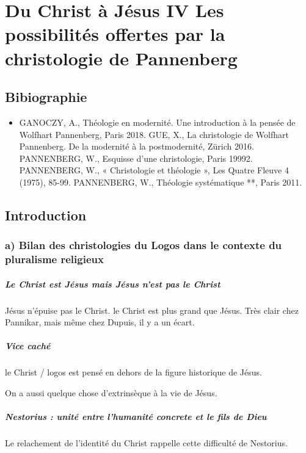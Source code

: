 \chapter{Du Christ à Jésus IV
Les possibilités offertes par la christologie de Pannenberg}
 

 

\section{Bibiographie}
\begin{itemize}
    \item GANOCZY, A., Théologie en modernité. Une introduction à la pensée de Wolfhart
Pannenberg, Paris 2018.
GUE, X., La christologie de Wolfhart Pannenberg. De la modernité à la postmodernité,
Zürich 2016.
PANNENBERG, W., Esquisse d’une christologie, Paris 19992.
PANNENBERG, W., « Christologie et théologie », Les Quatre Fleuve 4 (1975), 85-99.
PANNENBERG, W., Théologie systématique **, Paris 2011.
\end{itemize}



\section{Introduction}


\subsection{a) Bilan des christologies du Logos dans le contexte du pluralisme religieux}

\paragraph{Le Christ est Jésus mais Jésus n'est pas le Christ} Jésus n'épuise pas le Christ. le Christ est plus grand que Jésus. Très clair chez Pannikar, mais même chez Dupuis, il y a un écart.

\paragraph{Vice caché} le Christ / logos est pensé en dehors de la figure historique de Jésus. 
\begin{Ex}
On a aussi quelque chose d'extrinsèque à la vie de Jésus. 
\end{Ex}

\paragraph{Nestorius : unité entre l'humanité concrete et le fils de Dieu}
Le relachement de l'identité du Christ rappelle cette difficulté de Nestorius. 

